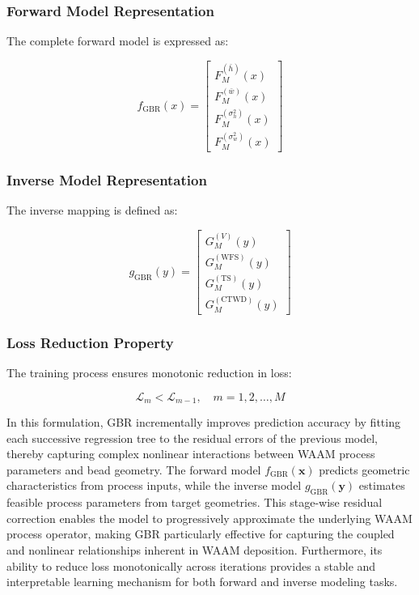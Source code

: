 \documentclass[11pt]{article}
\begin{document}

\subsubsection*{Forward Model Representation}

The complete forward model is expressed as:

\begin{equation}
f_{\mathrm{GBR}}(x) =
\begin{bmatrix}
F_M^{(\bar{h})}(x) \\
F_M^{(\bar{w})}(x) \\
F_M^{(\sigma_h^2)}(x) \\
F_M^{(\sigma_w^2)}(x)
\end{bmatrix}
\end{equation}


\subsubsection*{Inverse Model Representation}

The inverse mapping is defined as:

\begin{equation}
g_{\mathrm{GBR}}(y) =
\begin{bmatrix}
G_M^{(V)}(y) \\
G_M^{(\mathrm{WFS})}(y) \\
G_M^{(\mathrm{TS})}(y) \\
G_M^{(\mathrm{CTWD})}(y)
\end{bmatrix}
\end{equation}


\subsubsection*{Loss Reduction Property}

The training process ensures monotonic reduction in loss:

\begin{equation}
\mathcal{L}_m < \mathcal{L}_{m-1}, \quad m = 1,2,\dots,M
\end{equation}

In this formulation, GBR incrementally improves prediction accuracy by fitting each successive regression tree to the residual errors of the previous model, thereby capturing complex nonlinear interactions between WAAM process parameters and bead geometry. The forward model $f_{\mathrm{GBR}}(\mathbf{x})$ predicts geometric characteristics from process inputs, while the inverse model $g_{\mathrm{GBR}}(\mathbf{y})$ estimates feasible process parameters from target geometries. This stage-wise residual correction enables the model to progressively approximate the underlying WAAM process operator, making GBR particularly effective for capturing the coupled and nonlinear relationships inherent in WAAM deposition. Furthermore, its ability to reduce loss monotonically across iterations provides a stable and interpretable learning mechanism for both forward and inverse modeling tasks.
\end{document}
